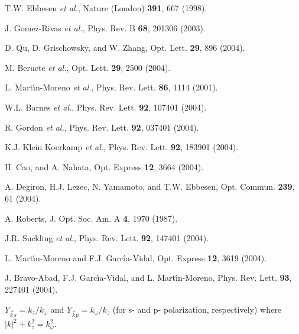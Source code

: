 \documentclass[aps,prl,twocolumn,showpacs,superscriptaddress,floatfix]{revtex4}
\begin{document}
\begin{thebibliography}{}

 T.W. Ebbesen {\it et al.}, Nature (London) {\bf 391}, 667 (1998).

 J. Gomez-Rivas {\it et al.}, Phys. Rev. B {\bf 68}, 201306 (2003).

 D. Qu, D. Grischowsky, and W. Zhang, Opt. Lett.
{\bf 29}, 896 (2004).

 M. Beruete {\it et al.}, Opt. Lett. {\bf 29}, 2500 (2004).

L. Mart\'{\i}n-Moreno {\it et al.}, Phys. Rev. Lett. {\bf 86},
1114 (2001).

 W.L. Barnes {\it et al.}, Phys. Rev. Lett. {\bf 92}, 107401
(2004).

 R. Gordon {\it et al.}, Phys. Rev. Lett. {\bf 92}, 037401
(2004).

 K.J. Klein Koerkamp {\it et al.}, Phys. Rev.
Lett. {\bf 92}, 183901 (2004).

 H. Cao, and A. Nahata, Opt. Express {\bf 12}, 3664
(2004).

 A. Degiron, H.J. Lezec, N. Yamamoto, and T.W.
Ebbesen, Opt. Commun. {\bf 239}, 61 (2004).

 A. Roberts, J. Opt. Soc. Am. A {\bf 4}, 1970
(1987).

%

 J.R. Suckling {\it et al.}, Phys. Rev. Lett.
{\bf 92}, 147401 (2004).

 L. Mart\'{\i}n-Moreno and F.J.
Garc\'{\i}a-Vidal, Opt. Express {\bf 12}, 3619 (2004).

 J. Bravo-Abad, F.J. Garc\'{\i}a-Vidal, and L.
Mart\'{\i}n-Moreno, Phys. Rev. Lett. {\bf 93}, 227401 (2004).

 $Y_{\vec{k}s} =
k_z/k_\omega$ and $Y_{\vec{k}p} = k_\omega/k_z$ (for s- and p-
polarization, respectively) where $|k|^2+k_z^2=k_\omega^2$.



\end{thebibliography}
\end{document}
